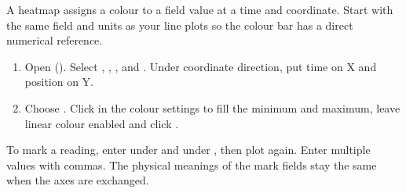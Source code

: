 A heatmap assigns a colour to a field value at a time and coordinate. Start with the same field and units as your line plots so the colour bar has a direct numerical reference.
\begin{enumerate}
\item Open  (). Select , , ,  and . Under coordinate direction, put time on X and position on Y.
\item Choose . Click  in the colour settings to fill the minimum and maximum, leave linear colour enabled and click .
\end{enumerate}
To mark a reading, enter  under  and  under , then plot again. Enter multiple values with commas. The physical meanings of the mark fields stay the same when the axes are exchanged.

